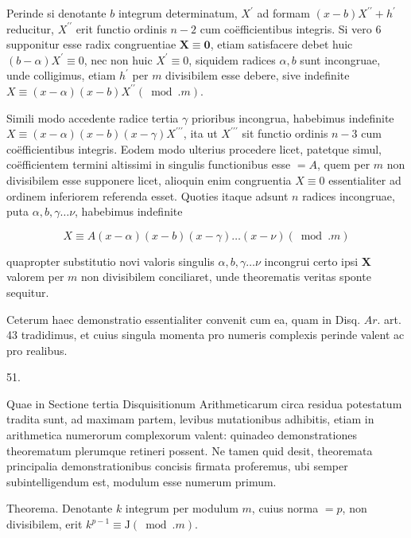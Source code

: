 \documentclass[10pt]{article}
\begin{document}
Perinde si denotante \(b\) integrum determinatum, \(X^{\prime}\) ad formam \((x-b) X^{\prime \prime}+h^{\prime}\) reducitur, \(X^{\prime \prime}\) erit functio ordinis \(n-2\) cum coëfficientibus integris. Si vero 6 supponitur esse radix congruentiae \(\boldsymbol{X} \equiv \mathbf{0}\), etiam satisfacere debet huic \((b-\alpha) X^{\prime} \equiv 0\), nec non huic \(X^{\prime} \equiv 0\), siquidem radices \(\alpha, b\) sunt incongruae, unde colligimus, etiam \(h^{\prime}\) per \(m\) divisibilem esse debere, sive indefinite \(X \equiv(x-\alpha)(x-b) X^{\prime \prime}(\bmod . m)\).

Simili modo accedente radice tertia \(\gamma\) prioribus incongrua, habebimus indefinite \(X \equiv(x-\alpha)(x-b)(x-\gamma) X^{\prime \prime \prime}\), ita ut \(X^{\prime \prime \prime}\) sit functio ordinis \(n-3\) cum coëfficientibus integris. Eodem modo ulterius procedere licet, patetque simul, coëfficientem termini altissimi in singulis functionibus esse \(=A\), quem per \(m\) non divisibilem esse supponere licet, alioquin enim congruentia \(X \equiv 0\) essentialiter ad ordinem inferiorem referenda esset. Quoties itaque adsunt \(n\) radices incongruae, puta \(\alpha, b, \gamma \ldots \nu\), habebimus indefinite

\[
X \equiv A(x-\alpha)(x-b)(x-\gamma) \ldots(x-\nu)(\bmod . m)
\]

quapropter substitutio novi valoris singulis \(\alpha, b, \gamma \ldots \nu\) incongrui certo ipsi \(\mathbf{X}\) valorem per \(m\) non divisibilem conciliaret, unde theorematis veritas sponte sequitur.

Ceterum haec demonstratio essentialiter convenit cum ea, quam in Disq. \(A r\). art. 43 tradidimus, et cuius singula momenta pro numeris complexis perinde valent ac pro realibus.

51.

Quae in Sectione tertia Disquisitionum Arithmeticarum circa residua potestatum tradita sunt, ad maximam partem, levibus mutationibus adhibitis, etiam in arithmetica numerorum complexorum valent: quinadeo demonstrationes theorematum plerumque retineri possent. Ne tamen quid desit, theoremata principalia demonstrationibus concisis firmata proferemus, ubi semper subintelligendum est, modulum esse numerum primum.

Theorema. Denotante \(k\) integrum per modulum \(m\), cuius norma \(=p\), non divisibilem, erit \(k^{p-1} \equiv \mathrm{J}(\bmod . m)\).
\end{document}
